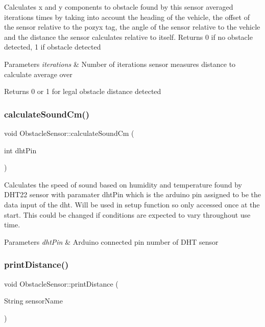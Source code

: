 Calculates x and y components to obstacle found by this sensor averaged iterations times by taking into account the heading of the vehicle, the offset of the sensor relative to the pozyx tag, the angle of the sensor relative to the vehicle and the distance the sensor calculates relative to itself. Returns 0 if no obstacle detected, 1 if obstacle detected 
\begin{DoxyParams}{Parameters}
{\em iterations} & Number of iterations sensor measures distance to calculate average over \\
\hline
\end{DoxyParams}
\begin{DoxyReturn}{Returns}
0 or 1 for legal obstacle distance detected 
\end{DoxyReturn}
\mbox{\label{class_obstacle_sensor_acd7255d7273231178876c5144b2269eb}} 
\subsubsection{\texorpdfstring{calculate\+Sound\+Cm()}{calculateSoundCm()}}
{\footnotesize\ttfamily void Obstacle\+Sensor\+::calculate\+Sound\+Cm (\begin{DoxyParamCaption}\item[{int}]{dht\+Pin }\end{DoxyParamCaption})\hspace{0.3cm}{\ttfamily [static]}}

Calculates the speed of sound based on humidity and temperature found by D\+H\+T22 sensor with paramater dht\+Pin which is the arduino pin assigned to be the data input of the dht. Will be used in setup function so only accessed once at the start. This could be changed if conditions are expected to vary throughout use time. 
\begin{DoxyParams}{Parameters}
{\em dht\+Pin} & Arduino connected pin number of D\+HT sensor \\
\hline
\end{DoxyParams}
\mbox{\label{class_obstacle_sensor_ad7b512504389e1925d3777f7395ef3ae}} 
\subsubsection{\texorpdfstring{print\+Distance()}{printDistance()}}
{\footnotesize\ttfamily void Obstacle\+Sensor\+::print\+Distance (\begin{DoxyParamCaption}\item[{String}]{sensor\+Name }\end{DoxyParamCaption})}

